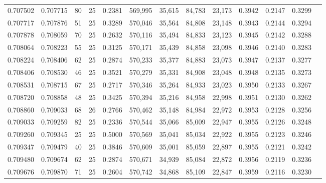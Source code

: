 \begin{tabular}{rrrrrrrrrrrrr}
0.707502 & 0.707715 &    80 &  25 &                                     0.2381 & 569,995 &  35,615 &  84,783 &  23,173 & 0.3942 & 0.2147 & 0.3299 \\
0.707717 & 0.707876 &    51 &  25 &                                     0.3289 & 570,046 &  35,564 &  84,808 &  23,148 & 0.3943 & 0.2144 & 0.3294 \\
0.707878 & 0.708059 &    70 &  25 &                                     0.2632 & 570,116 &  35,494 &  84,833 &  23,123 & 0.3945 & 0.2142 & 0.3288 \\
0.708064 & 0.708223 &    55 &  25 &                                     0.3125 & 570,171 &  35,439 &  84,858 &  23,098 & 0.3946 & 0.2140 & 0.3283 \\
0.708224 & 0.708406 &    62 &  25 &                                     0.2874 & 570,233 &  35,377 &  84,883 &  23,073 & 0.3947 & 0.2137 & 0.3277 \\
0.708406 & 0.708530 &    46 &  25 &                                     0.3521 & 570,279 &  35,331 &  84,908 &  23,048 & 0.3948 & 0.2135 & 0.3273 \\
0.708531 & 0.708715 &    67 &  25 &                                     0.2717 & 570,346 &  35,264 &  84,933 &  23,023 & 0.3950 & 0.2133 & 0.3267 \\
0.708720 & 0.708858 &    48 &  25 &                                     0.3425 & 570,394 &  35,216 &  84,958 &  22,998 & 0.3951 & 0.2130 & 0.3262 \\
0.708860 & 0.709033 &    68 &  26 &                                     0.2766 & 570,462 &  35,148 &  84,984 &  22,972 & 0.3953 & 0.2128 & 0.3256 \\
0.709033 & 0.709259 &    82 &  25 &                                     0.2336 & 570,544 &  35,066 &  85,009 &  22,947 & 0.3955 & 0.2126 & 0.3248 \\
0.709260 & 0.709345 &    25 &  25 &                                     0.5000 & 570,569 &  35,041 &  85,034 &  22,922 & 0.3955 & 0.2123 & 0.3246 \\
0.709347 & 0.709479 &    40 &  25 &                                     0.3846 & 570,609 &  35,001 &  85,059 &  22,897 & 0.3955 & 0.2121 & 0.3242 \\
0.709480 & 0.709674 &    62 &  25 &                                     0.2874 & 570,671 &  34,939 &  85,084 &  22,872 & 0.3956 & 0.2119 & 0.3236 \\
0.709676 & 0.709870 &    71 &  25 &                                     0.2604 & 570,742 &  34,868 &  85,109 &  22,847 & 0.3959 & 0.2116 & 0.3230 \\

\end{tabular}
